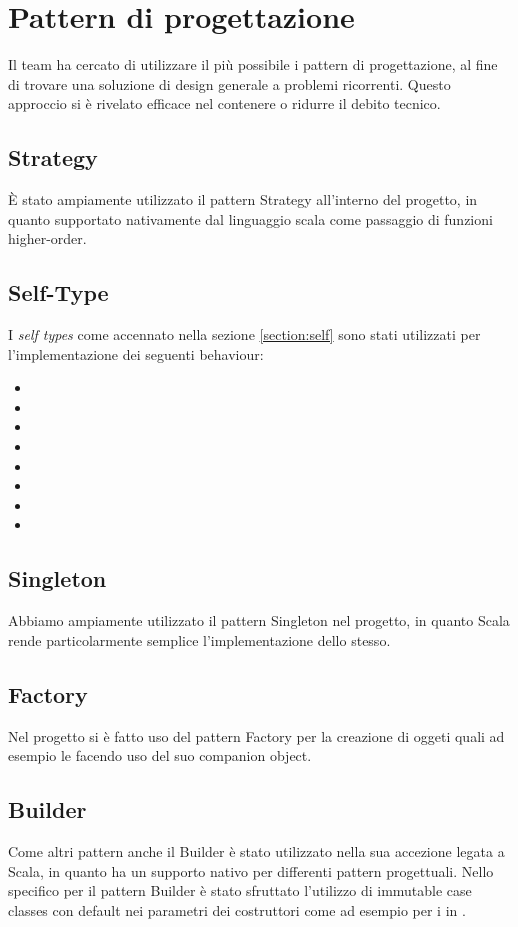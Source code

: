 \section{Pattern di progettazione}
Il team ha cercato di utilizzare il più possibile i pattern di progettazione, al fine di trovare una soluzione di design generale a problemi ricorrenti. Questo approccio si è rivelato efficace nel contenere o ridurre il debito tecnico.
\subsection{Strategy}
È stato ampiamente utilizzato il pattern Strategy all’interno del progetto, in quanto supportato nativamente dal linguaggio scala come passaggio di funzioni higher-order.
\subsection{Self-Type}
I \textit{self types} come accennato nella sezione \ref{section:self} sono stati utilizzati per l'implementazione dei seguenti behaviour:
\begin{itemize}
    \item {}
    \item {}
    \item {}
    \item {}
    \item {}
    \item {}
    \item {}
    \item {}
\end{itemize}
\subsection{Singleton}
Abbiamo ampiamente utilizzato il pattern Singleton nel progetto, in quanto Scala rende particolarmente semplice l’implementazione dello stesso.
\subsection{Factory}
Nel progetto si è fatto uso del pattern Factory per la creazione di oggeti quali ad esempio le  facendo uso del suo companion object.
\subsection{Builder}
Come altri pattern anche il Builder è stato utilizzato nella sua accezione legata a Scala, in quanto ha un supporto nativo per differenti pattern progettuali. Nello specifico per il pattern Builder è stato sfruttato l’utilizzo di immutable case classes con default nei parametri dei costruttori come ad esempio per i  in .


